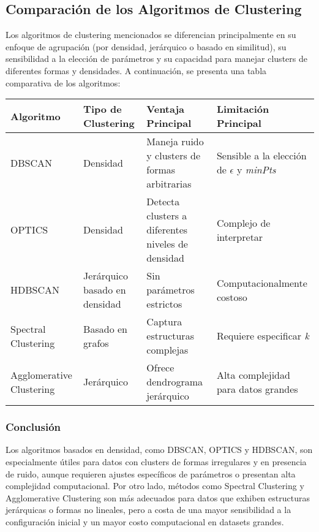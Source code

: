 \subsection*{Comparación de los Algoritmos de Clustering}

Los algoritmos de clustering mencionados se diferencian principalmente en su enfoque de agrupación (por densidad, jerárquico o basado en similitud), su sensibilidad a la elección de parámetros y su capacidad para manejar clusters de diferentes formas y densidades. A continuación, se presenta una tabla comparativa de los algoritmos:

\begin{table}[ht]
\centering
\begin{tabular}{|p{2.2cm}||p{2.2cm}|p{3.7cm}|p{4cm}|}
\hline
\textbf{Algoritmo} & \textbf{Tipo de Clustering} & \textbf{Ventaja Principal} & \textbf{Limitación Principal} \\
\hline
DBSCAN & Densidad & Maneja ruido y clusters de formas arbitrarias & Sensible a la elección de \(\epsilon\) y \textit{minPts} \\
OPTICS & Densidad & Detecta clusters a diferentes niveles de densidad & Complejo de interpretar \\
HDBSCAN & Jerárquico basado en densidad & Sin parámetros estrictos & Computacionalmente costoso \\
Spectral Clustering & Basado en grafos & Captura estructuras complejas & Requiere especificar \textit{k} \\
Agglomerative Clustering & Jerárquico & Ofrece dendrograma jerárquico & Alta complejidad para datos grandes \\
\hline
\end{tabular}
\end{table}

\subsubsection*{Conclusión}

Los algoritmos basados en densidad, como DBSCAN, OPTICS y HDBSCAN, son especialmente útiles para datos con clusters de formas irregulares y en presencia de ruido, aunque requieren ajustes específicos de parámetros o presentan alta complejidad computacional. Por otro lado, métodos como Spectral Clustering y Agglomerative Clustering son más adecuados para datos que exhiben estructuras jerárquicas o formas no lineales, pero a costa de una mayor sensibilidad a la configuración inicial y un mayor costo computacional en datasets grandes.

